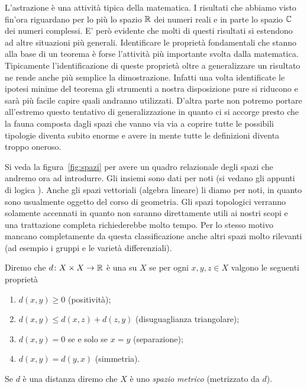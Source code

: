 L'astrazione è una attività tipica della matematica. I risultati che abbiamo
visto fin'ora riguardano per lo più lo spazio $\mathbb R$ dei numeri reali
e in parte lo spazio $\mathbb C$ dei numeri complessi.
E' però evidente che molti di questi risultati si estendono ad altre situazioni
più generali. Identificare le proprietà fondamentali che stanno alla base
di un teorema è forse l'attività più importante svolta dalla matematica.
Tipicamente l'identificazione di queste proprietà oltre a generalizzare
un risultato ne rende anche più semplice la dimostrazione.
Infatti una volta identificate le ipotesi minime del teorema
gli strumenti a nostra disposizione pure si riducono e sarà più facile
capire quali andranno utilizzati.
D'altra parte non potremo portare all'estremo questo tentativo di generalizzazione
in quanto ci si accorge presto che la fauna composta dagli spazi che vanno via
via a coprire tutte le possibili tipologie diventa subito enorme e avere
in mente tutte le definizioni diventa troppo oneroso.

Si veda la figura~\ref{fig:spazi} per avere un quadro relazionale
degli spazi che andremo ora ad introdurre.
Gli insiemi sono dati per noti (si vedano gli appunti di logica \cite{appunti_logica}).
Anche gli spazi vettoriali (algebra lineare) li diamo per noti, in quanto sono usualmente oggetto
del corso di geometria.
Gli spazi topologici verranno solamente accennati in quanto non saranno direttamente
utili ai nostri scopi e una trattazione completa richiederebbe molto tempo.
Per lo stesso motivo mancano completamente da questa classificazione anche altri
spazi molto rilevanti (ad esempio i gruppi e le varietà differenziali).


\begin{definition}
\mymark{**}
\label{def:distanza}
Diremo che $d\colon X\times X\to\mathbb R$ è una  su $X$
se per ogni $x,y,z\in X$ valgono le seguenti proprietà
\begin{enumerate}
\item
  $d(x,y)\ge 0$ (positività);
\item
  $d(x,y)\le d(x,z) + d(z,y)$ (disuguaglianza triangolare);
\item
  $d(x,y)=0$ se e solo se $x=y$ (separazione);
\item
  $d(x,y) = d(y,x)$ (simmetria).
\end{enumerate}

Se $d$ è una distanza
diremo che $X$ è uno
\emph{spazio metrico}
%
%
(metrizzato da $d$).
\end{definition}

